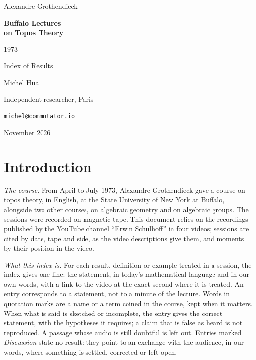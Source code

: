 \documentclass[11pt]{article}
\newcommand{\q}[1]{“#1”}
\begin{document}
\begin{titlepage}
\centering
\vspace*{3cm}
{\large Alexandre Grothendieck\par}
\vspace{1.2cm}
{\Huge\bfseries Buffalo Lectures\\[0.3em] on Topos Theory\par}
\vspace{0.6cm}
{\Large 1973\par}
\vspace{1.2cm}
{\large Index of Results\par}
\vfill
{\large Michel Hua\par}
{\small Independent researcher, Paris\par}
{\small \texttt{michel@commutator.io}\par}
\vspace{1cm}
{\small November 2026\par}
\end{titlepage}
\tableofcontents
\clearpage

\section*{Introduction}

\emph{The course.} From April to July 1973, Alexandre Grothendieck gave a course on topos theory, in English, at the State University of New York at Buffalo, alongside two other courses, on algebraic geometry and on algebraic groups. The sessions were recorded on magnetic tape. This document relies on the recordings published by the YouTube channel \q{Erwin Schulhoff} in four videos; sessions are cited by date, tape and side, as the video descriptions give them, and moments by their position in the video.

\emph{What this index is.} For each result, definition or example treated in a session, the index gives one line: the statement, in today’s mathematical language and in our own words, with a link to the video at the exact second where it is treated. An entry corresponds to a statement, not to a minute of the lecture. Words in quotation marks are a name or a term coined in the course, kept when it matters. When what is said is sketched or incomplete, the entry gives the correct statement, with the hypotheses it requires; a claim that is false as heard is not reproduced. A passage whose audio is still doubtful is left out. Entries marked \emph{Discussion} state no result: they point to an exchange with the audience, in our words, where something is settled, corrected or left open.
\end{document}
